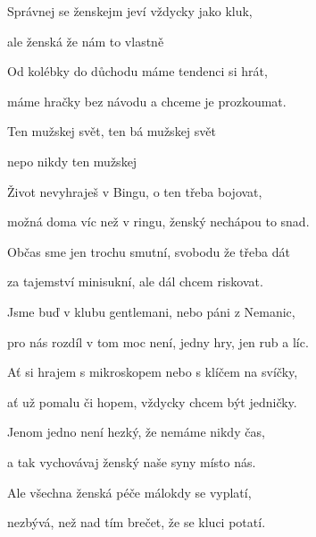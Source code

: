 

\zs
Správnej  se ženskejm jeví vždycky  jako kluk,

ale  ženská  že  nám to vlastně 

Od kolébky do důchodu máme tendenci si hrát,

máme hračky bez návodu a chceme je prozkoumat.
\ks

\zr
Ten  mužskej svět, ten bá mužskej svět

nepo nikdy  ten  mužskej 
\kr

\zs
Život nevyhraješ v Bingu, o ten třeba bojovat,

možná doma víc než v ringu, ženský nechápou to snad.

Občas sme jen trochu smutní, svobodu že třeba dát

za tajemství minisukní, ale dál chcem riskovat.
\ks

\zr\kr

\zs
Jsme buď v klubu gentlemani, nebo páni z Nemanic,

pro nás rozdíl v tom moc není, jedny hry, jen rub a líc.

Ať si hrajem s mikroskopem nebo s klíčem na svíčky,

ať už pomalu či hopem, vždycky chcem být jedničky.
\ks

\zr \kr

\zs
Jenom jedno není hezký, že nemáme nikdy čas,

a tak vychovávaj ženský naše syny místo nás.

Ale všechna ženská péče málokdy se vyplatí,

nezbývá, než nad tím brečet, že se kluci potatí.
\ks

\zr \kr

\kp



